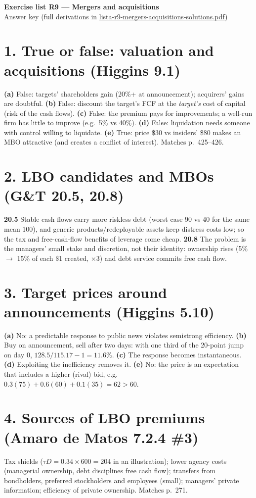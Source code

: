 \documentclass[11pt,a4paper]{article}
\begin{document}
\begin{center}{\Large\bfseries Exercise list R9 --- Mergers and acquisitions}\\[4pt]{\large Answer key (full derivations in \url{lista-r9-mergers-acquisitions-solutions.pdf})}\end{center}

\section*{1. True or false: valuation and acquisitions (Higgins 9.1)}
\textbf{(a)} False: targets' shareholders gain (20\%+ at announcement); acquirers' gains are doubtful.
\textbf{(b)} False: discount the target's FCF at the \emph{target's} cost of capital (risk of the cash flows).
\textbf{(c)} False: the premium pays for improvements; a well-run firm has little to improve (e.g.\ 5\% vs 40\%).
\textbf{(d)} False: liquidation needs someone with control willing to liquidate.
\textbf{(e)} True: price \$30 vs insiders' \$80 makes an MBO attractive (and creates a conflict of interest). Matches p.~425--426.

\section*{2. LBO candidates and MBOs (G\&T 20.5, 20.8)}
\textbf{20.5} Stable cash flows carry more riskless debt (worst case 90 vs 40 for the same mean 100), and
generic products/redeployable assets keep distress costs low; so the tax and free-cash-flow benefits of
leverage come cheap. \textbf{20.8} The problem is the managers' small stake and discretion, not their
identity: ownership rises (5\% $\to$ 15\% of each \$1 created, $\times3$) and debt service commits free cash flow.

\section*{3. Target prices around announcements (Higgins 5.10)}
\textbf{(a)} No: a predictable response to public news violates semistrong efficiency.
\textbf{(b)} Buy on announcement, sell after two days: with one third of the 20-point jump on day 0,
$128.5/115.17-1=11.6\%$. \textbf{(c)} The response becomes instantaneous. \textbf{(d)} Exploiting the
inefficiency removes it. \textbf{(e)} No: the price is an expectation that includes a higher (rival) bid,
e.g.\ $0.3(75)+0.6(60)+0.1(35)=62>60$.

\section*{4. Sources of LBO premiums (Amaro de Matos 7.2.4 \#3)}
Tax shields ($\tau D=0.34\times600=204$ in an illustration); lower agency costs (managerial ownership, debt
disciplines free cash flow); transfers from bondholders, preferred stockholders and employees (small);
managers' private information; efficiency of private ownership. Matches p.~271.
\end{document}
